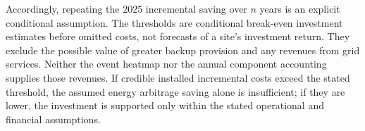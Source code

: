 Accordingly, repeating the 2025 incremental saving over $n$ years is an explicit conditional assumption. \textcolor{LatestGreen}{The thresholds are conditional break-even investment estimates before omitted costs, not forecasts of a site's investment return.} They exclude the possible value of greater backup provision and any revenues from grid services. Neither the event heatmap nor the annual component accounting supplies those revenues. If credible installed incremental costs exceed the stated threshold, the assumed \textcolor{LatestGreen}{energy arbitrage} saving alone is insufficient; if they are lower, \textcolor{LatestGreen}{the investment is supported only within the stated operational and financial assumptions.}
